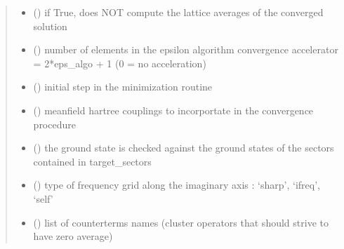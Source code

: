 \documentclass[letterpaper,10pt,english]{sphinxmanual}
\begin{document}
\begin{fulllineitems}
\begin{quote}
\begin{description}
\begin{itemize}
\item {} 
\sphinxAtStartPar
{} () \textendash{} if True, does NOT compute the lattice averages of the converged solution

\item {} 
\sphinxAtStartPar
{} () \textendash{} number of elements in the epsilon algorithm convergence accelerator = 2*eps\_algo + 1 (0 = no acceleration)

\item {} 
\sphinxAtStartPar
{} () \textendash{} initial step in the minimization routine

\item {} 
\sphinxAtStartPar
{} (\sphinxstyleliteralemphasis{\sphinxupquote{{[}}}\sphinxstyleliteralemphasis{\sphinxupquote{{]}}}) \textendash{} mean\sphinxhyphen{}field hartree couplings to incorportate in the convergence procedure

\item {} 
\sphinxAtStartPar
{} (\sphinxstyleliteralemphasis{\sphinxupquote{{[}}}\sphinxstyleliteralemphasis{\sphinxupquote{{]}}}) \textendash{} the ground state is checked against the ground states of the sectors contained in target\_sectors

\item {} 
\sphinxAtStartPar
{} () \textendash{} type of frequency grid along the imaginary axis : ‘sharp’, ‘ifreq’, ‘self’

\item {} 
\sphinxAtStartPar
{} (\sphinxstyleliteralemphasis{\sphinxupquote{{[}}}\sphinxstyleliteralemphasis{\sphinxupquote{{]}}}) \textendash{} list of counterterms names (cluster operators that should strive to have zero average)


\end{itemize}
\end{description}
\end{quote}
\end{fulllineitems}
\end{document}
